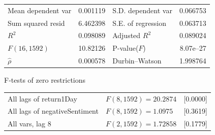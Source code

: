 \begin{center}
\vspace{1ex}
\begin{tabular}{lrlr}
Mean dependent var &  0.001119 & S.D. dependent var &  0.066753 \\
Sum squared resid &  6.462398 & S.E. of regression &  0.063713 \\
$R^2$ &  0.098089 & Adjusted $R^2$ &  0.089024 \\
$F(16, 1592)$ &  10.82126 & P-value($F$) &  8.07\textrm{e--27} \\
$\hat{\rho}$ &  0.000578 & Durbin--Watson &  1.998764 \\
\end{tabular}


\end{center}

\begin{center}
F-tests of zero restrictions\\[1em]
\begin{tabular}{lll}
All lags of return1Day & $F(8, 1592) = 20.2874$ & [0.0000]\\
All lags of negativeSentiment & $F(8, 1592) = 1.0975$ & [0.3619]\\
All vars, lag 8 & $F(2, 1592) = 1.72858$ & [0.1779]\\
\end{tabular}
\end{center}

\clearpage


